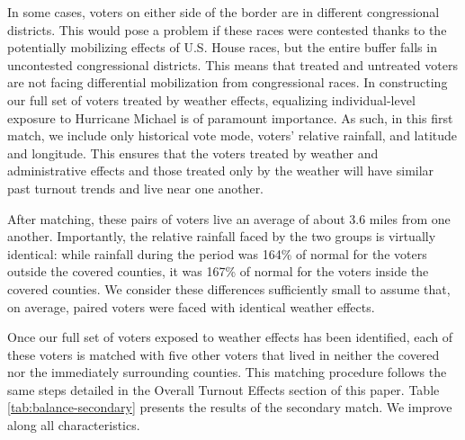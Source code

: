 \documentclass[
  12pt,
]{article}
\begin{document}
In some cases, voters on either side of the border are in different congressional districts. This would pose a problem if these races were contested thanks to the potentially mobilizing effects of U.S. House races, but the entire buffer falls in uncontested congressional districts. This means that treated and untreated voters are not facing differential mobilization from congressional races. In constructing our full set of voters treated by weather effects, equalizing individual-level exposure to Hurricane Michael is of paramount importance. As such, in this first match, we include only historical vote mode, voters' relative rainfall, and latitude and longitude. This ensures that the voters treated by weather and administrative effects and those treated only by the weather will have similar past turnout trends and live near one another.

After matching, these pairs of voters live an average of about 3.6 miles from one another. Importantly, the relative rainfall faced by the two groups is virtually identical: while rainfall during the period was 164\% of normal for the voters outside the covered counties, it was 167\% of normal for the voters inside the covered counties. We consider these differences sufficiently small to assume that, on average, paired voters were faced with identical weather effects.

Once our full set of voters exposed to weather effects has been identified, each of these voters is matched with five other voters that lived in neither the covered nor the immediately surrounding counties. This matching procedure follows the same steps detailed in the Overall Turnout Effects section of this paper. Table \ref{tab:balance-secondary} presents the results of the secondary match. We improve along all characteristics.
\end{document}
